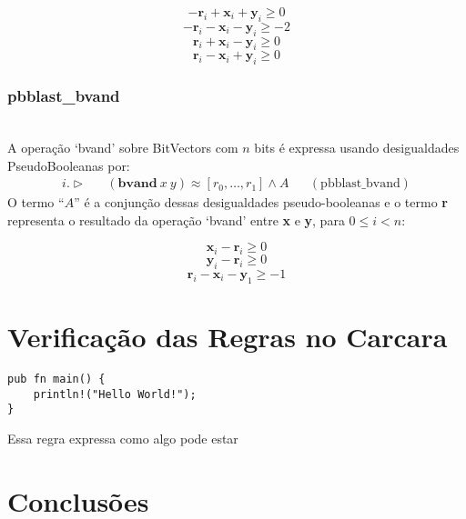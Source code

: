\documentclass[conference]{IEEEtran}
\begin{document}
\[ -\textbf{r}_i+\textbf{x}_i+\textbf{y}_i\ge 0 \]
\[ -\textbf{r}_i-\textbf{x}_i-\textbf{y}_i\ge -2 \]
\[ \textbf{r}_i+\textbf{x}_i-\textbf{y}_i\ge 0 \]
\[ \textbf{r}_i-\textbf{x}_i+\textbf{y}_i\ge 0 \]

\subsubsection{\textbf{pbblast\_bvand}}
\noindent\\
A operação `bvand' sobre BitVectors com $n$ bits é expressa usando desigualdades PseudoBooleanas por:
\begin{align*}
    i. \vartriangleright &  & (\textbf{bvand}\ x\ y) \approx [r_0,\dots,r_1] \land A &  & (\text{pbblast\_bvand})
\end{align*}
O termo ``$A$'' é a conjunção dessas desigualdades pseudo-booleanas e o termo \textbf{r} representa
o resultado da operação `bvand' entre \textbf{x} e \textbf{y}, para $0 \le i < n$:

\[ \textbf{x}_i-\textbf{r}_i\ge 0 \]
\[ \textbf{y}_i-\textbf{r}_i\ge 0 \]
\[ \textbf{r}_i-\textbf{x}_i-\textbf{y}_1\ge -1 \]

\section{Verificação das Regras no Carcara}

\begin{verbatim}
pub fn main() {
    println!("Hello World!");
}
\end{verbatim}

Essa regra expressa como algo pode estar



\section*{Conclusões}
\end{document}
